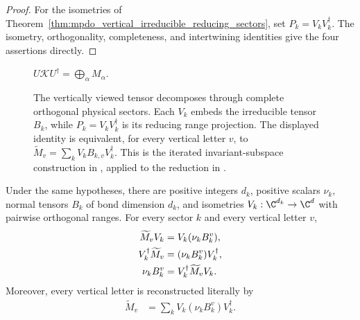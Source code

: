 \begin{proof}
    \leanok
    For the isometries of
    Theorem~\ref{thm:mpdo_vertical_irreducible_reducing_sectors}, set
    $P_k=V_kV_k^\dagger$. The isometry, orthogonality, completeness, and
    intertwining identities give the four assertions directly.
\end{proof}

\begin{figure}[ht]
    \centering
    $U\mathcal K U^\dagger=\bigoplus_\alpha M_\alpha$.
    \caption{The vertically viewed tensor decomposes through complete
    orthogonal physical sectors. Each $V_k$ embeds the irreducible tensor
    $B_k$, while $P_k=V_kV_k^\dagger$ is its reducing range projection. The
    displayed identity is equivalent, for every vertical letter $v$, to
    $\widetilde M_v=\sum_kV_kB_{k,v}V_k^\dagger$.
    This is the iterated invariant-subspace construction in
    \cite[lines~200--219]{Cirac2016MPDO_arXiv}, applied to the reduction in
    \cite[Proposition~4.13, lines~1873--1887]{Cirac2016MPDO_arXiv}.}
    \label{fig:mpdo_vertical_reducing_sectors}
\end{figure}

\begin{theorem}
    \label{thm:mpdo_vertical_normal_sectors_with_isometries}
    \leanok
    Under the same hypotheses, there are positive integers $d_k$, positive
    scalars $\nu_k$, normal tensors $B_k$ of bond dimension $d_k$, and
    isometries $V_k:\C^{d_k}\to\C^d$ with pairwise orthogonal ranges. For
    every sector $k$ and every vertical letter $v$,
    \begin{align}
        \widetilde M_vV_k&=V_k(\nu_kB_k^v),
        \notag\\
        V_k^\dagger\widetilde M_v&=(\nu_kB_k^v)V_k^\dagger,
        \notag\\
        \nu_kB_k^v&=V_k^\dagger\widetilde M_vV_k.
        \notag
    \end{align}
    Moreover, every vertical letter is reconstructed literally by
    \begin{align}
        \widetilde M_v
        &=\sum_kV_k(\nu_kB_k^v)V_k^\dagger.
        \label{eq:mpdo_vertical_normal_reconstruction}
    \end{align}
\end{theorem}

